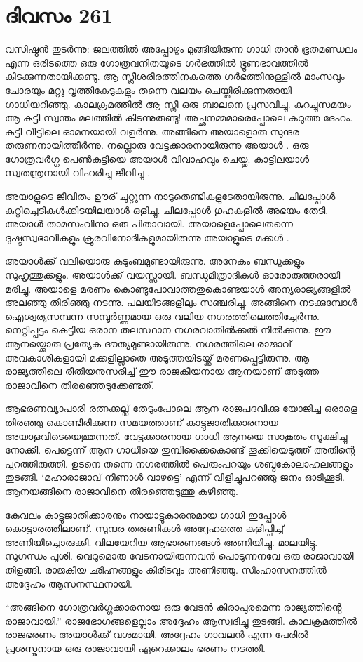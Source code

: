 \section{ദിവസം 261}


വസിഷ്ഠന്‍ തുടര്‍ന്നു: ജലത്തില്‍ അപ്പോഴും മുങ്ങിയിരുന്ന ഗാധി താന്‍ ഭൂതമണ്ഡലം എന്ന ഒരിടത്തെ ഒരു ഗോത്രവനിതയുടെ ഗര്‍ഭത്തില്‍ ഭ്രൂണഭാവത്തില്‍ കിടക്കുന്നതായിക്കണ്ടു. ആ സ്ത്രീശരീരത്തിനകത്തെ ഗര്‍ഭത്തിനുള്ളില്‍ മാംസവും ചോരയും മറ്റു വൃത്തികേടുകളും  തന്നെ വലയം ചെയ്തിരിക്കുന്നതായി ഗാധിയറിഞ്ഞു. കാലക്രമത്തില്‍ ആ സ്ത്രീ ഒരു ബാലനെ പ്രസവിച്ചു. കുറച്ചുസമയം ആ കുട്ടി സ്വന്തം മലത്തില്‍ കിടന്നുരുണ്ടു! അച്ഛനമ്മമാരെപ്പോലെ കറുത്ത ദേഹം. കുട്ടി വീട്ടിലെ ഓമനയായി വളര്‍ന്നു. അങ്ങിനെ അയാളൊരു സുന്ദര തരുണനായിത്തീര്‍ന്നു. നല്ലൊരു വേട്ടക്കാരനായിരുന്നു അയാള്‍ . ഒരു ഗോത്രവര്‍ഗ്ഗ പെണ്‍കുട്ടിയെ അയാള്‍ വിവാഹവും ചെയ്തു. കാട്ടിലയാള്‍ സ്വതന്ത്രനായി വിഹരിച്ചു ജീവിച്ചു .

അയാളുടെ ജീവിതം ഊര് ചുറ്റുന്ന നാടുതെണ്ടികളുടേതായിരുന്നു. ചിലപ്പോള്‍ കുറ്റിച്ചെടികള്‍ക്കിടയിലയാള്‍ ഒളിച്ചു. ചിലപ്പോള്‍ ഗുഹകളില്‍ അഭയം തേടി. അയാള്‍ താമസംവിനാ ഒരു പിതാവായി. അയാളെപ്പോലെതന്നെ ദുഷ്ടസ്വഭാവികളും ക്രൂരവിനോദികളുമായിരുന്നു അയാളുടെ മക്കള്‍ .

അയാള്‍ക്ക്‌ വലിയൊരു കുടുംബമുണ്ടായിരുന്നു. അനേകം ബന്ധുക്കളും സുഹൃത്തുക്കളും. അയാള്‍ക്ക്‌ വയസ്സായി. ബന്ധുമിത്രാദികള്‍ ഓരോരുത്തരായി മരിച്ചു. അയാളെ മരണം കൊണ്ടുപോവാത്തതുകൊണ്ടയാള്‍ അന്യരാജ്യങ്ങളില്‍ അലഞ്ഞു തിരിഞ്ഞു നടന്നു. പലയിടങ്ങളിലും സഞ്ചരിച്ചു. അങ്ങിനെ നടക്കുമ്പോള്‍ ഐശ്വര്യസമ്പന്ന സമ്പൂര്‍ണ്ണമായ ഒരു വലിയ നഗരത്തിലെത്തിച്ചേര്‍ന്നു. നെറ്റിപ്പട്ടം കെട്ടിയ ഒരാന തലസ്ഥാന നഗരവാതില്‍ക്കല്‍ നില്‍ക്കുന്നു. ഈ ആനയ്ക്കൊരു പ്രത്യേക ദൗത്യമുണ്ടായിരുന്നു. നഗരത്തിലെ രാജാവ് അവകാശികളായി മക്കളില്ലാതെ അടുത്തയിടയ്ക്ക് മരണപ്പെട്ടിരുന്നു. ആ രാജ്യത്തിലെ രീതിയനുസരിച്ച് ഈ രാജകീയനായ ആനയാണ് അടുത്ത രാജാവിനെ തിരഞ്ഞെടുക്കേണ്ടത്.

ആഭരണവ്യാപാരി രത്നക്കല്ല് തേടുംപോലെ ആന  രാജപദവിക്കു യോജിച്ച ഒരാളെ തിരഞ്ഞു കൊണ്ടിരിക്കുന്ന സമയത്താണ് കാട്ടുജാതിക്കാരനായ അയാളവിടെയെത്തുന്നത്. വേട്ടക്കാരനായ ഗാധി ആനയെ സാകൂതം സൂക്ഷിച്ചു നോക്കി. പെട്ടെന്ന് ആന ഗാധിയെ തുമ്പിക്കൈകൊണ്ട് തൂക്കിയെടുത്ത് അതിന്റെ പുറത്തിരുത്തി. ഉടനെ തന്നെ നഗരത്തില്‍ പെരുംപറയും ശബ്ദകോലാഹലങ്ങളും തുടങ്ങി. ‘മഹാരാജാവ് നീണാള്‍ വാഴട്ടെ’ എന്ന് വിളിച്ചുപറഞ്ഞു ജനം ഓടിക്കൂടി. ആനയങ്ങിനെ  രാജാവിനെ തിരഞ്ഞെടുത്തു കഴിഞ്ഞു.

കേവലം കാട്ടുജാതിക്കാരനും നായാട്ടുകാരനുമായ ഗാധി ഇപ്പോള്‍ കൊട്ടാരത്തിലാണ്. സുന്ദര തരുണികള്‍ അദ്ദേഹത്തെ കുളിപ്പിച്ച് അണിയിച്ചൊരുക്കി. വിലയേറിയ ആഭാരണങ്ങള്‍ അണിയിച്ചു. മാലയിട്ടു. സുഗന്ധം പൂശി. വെറുമൊരു വേടനായിരുന്നവന്‍ പൊടുന്നനവേ ഒരു രാജാവായി തിളങ്ങി. രാജകീയ ഛിഹ്നങ്ങളും കിരീടവും അണിഞ്ഞു. സിംഹാസനത്തില്‍ അദ്ദേഹം ആസനസ്ഥനായി.

“അങ്ങിനെ ഗോത്രവര്‍ഗ്ഗക്കാരനായ ഒരു വേടന്‍ കിരാപുരമെന്ന രാജ്യത്തിന്റെ രാജാവായി.” രാജഭോഗങ്ങളെല്ലാം അദ്ദേഹം ആസ്വദിച്ചു തുടങ്ങി. കാലക്രമത്തില്‍ രാജഭരണം അയാള്‍ക്ക്‌ വശമായി. അദ്ദേഹം ഗാവലന്‍ എന്ന പേരില്‍ പ്രശസ്തനായ ഒരു രാജാവായി ഏറെക്കാലം ഭരണം നടത്തി.